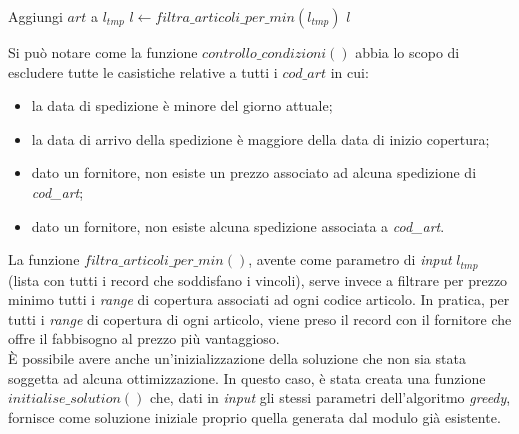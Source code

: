 \begin{algorithm}
    \begin{algorithmic}
                    \State Aggiungi $art$ a $l_{tmp}$
                \EndIf
            \EndFor
        \EndWhile
        \State $l \gets filtra\_articoli\_per\_min(l_{tmp})$
        \State \Return $l$
        \EndProcedure
    \end{algorithmic}
\end{algorithm}
\vspace*{\fill}
\newpage
\noindent Si può notare come la funzione $controllo\_condizioni()$ abbia lo scopo di escludere tutte le casistiche relative a tutti i $cod\_art$ in cui:
\begin{itemize}
    \item la data di spedizione è minore del giorno attuale;
    \item la data di arrivo della spedizione è maggiore della data di inizio copertura;
    \item dato un fornitore, non esiste un prezzo associato ad alcuna spedizione di \textit{cod\_art};
    \item dato un fornitore, non esiste alcuna spedizione associata a \textit{cod\_art}.
\end{itemize}

\noindent La funzione $filtra\_articoli\_per\_min()$, avente come parametro di \textit{input} $l_{tmp}$ (lista con tutti i record che soddisfano i vincoli),
serve invece a filtrare per prezzo minimo tutti i \textit{range} di copertura associati ad ogni codice articolo.
In pratica, per tutti i \textit{range} di copertura di ogni articolo, viene preso il record con il fornitore che offre il fabbisogno al prezzo più vantaggioso.\\

\noindent È possibile avere anche un'inizializzazione della soluzione che non sia stata soggetta ad alcuna ottimizzazione.
In questo caso, è stata creata una funzione $initialise\_solution()$ che, dati in \textit{input} gli stessi parametri dell'algoritmo \textit{greedy}, fornisce
come soluzione iniziale proprio quella generata dal modulo già esistente. 

